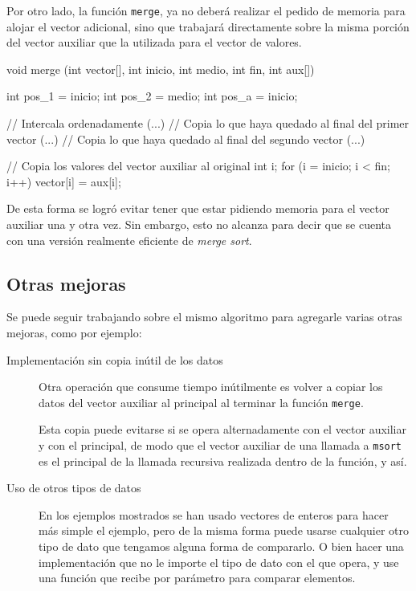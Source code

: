 Por otro lado, la función \lstinline!merge!, ya no deberá realizar el
pedido de memoria para alojar el vector adicional, sino que trabajará
directamente sobre la misma porción del vector auxiliar que la utilizada
para el vector de valores.

\begin{codigo-c}
void merge (int vector[], int inicio, int medio, int fin, int aux[])
{
    int pos_1 = inicio;
    int pos_2 = medio;
    int pos_a = inicio;

    // Intercala ordenadamente (...)
    // Copia lo que haya quedado al final del primer vector (...)
    // Copia lo que haya quedado al final del segundo vector (...)

    // Copia los valores del vector auxiliar al original
    int i;
    for (i = inicio; i < fin; i++) {
        vector[i] = aux[i];
    }
}
\end{codigo-c}

De esta forma se logró evitar tener que estar pidiendo memoria para el
vector auxiliar una y otra vez.  Sin embargo, esto no alcanza para decir
que se cuenta con una versión realmente eficiente de \textit{merge sort}.

\subsection{Otras mejoras}

Se puede seguir trabajando sobre el mismo algoritmo para agregarle varias
otras mejoras, como por ejemplo:

\begin{description}

\item[Implementación sin copia inútil de los datos]

Otra operación que consume tiempo inútilmente es volver a copiar los
datos del vector auxiliar al principal al terminar la función
\lstinline!merge!.

Esta copia puede evitarse si se opera alternadamente
con el vector auxiliar y con el principal, de modo que el vector auxiliar
de una llamada a \lstinline!msort! es el principal de la llamada recursiva
realizada dentro de la función, y así.

\item[Uso de otros tipos de datos]

En los ejemplos mostrados se han usado vectores de enteros para hacer más
simple el ejemplo, pero de la misma forma puede usarse cualquier otro tipo
de dato que tengamos alguna forma de compararlo. O bien hacer una
implementación que no le importe el tipo de dato con el que opera, y use
una función que recibe por parámetro para comparar elementos.

\end{description}

